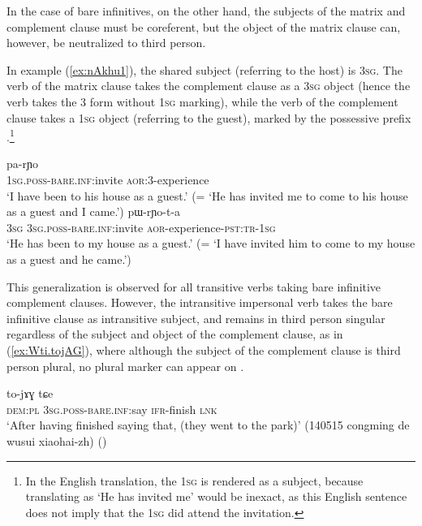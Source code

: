 In the case of bare infinitives, on the other hand, the subjects of the matrix and complement clause must be coreferent, but the object of the matrix clause can, however, be neutralized to third person.

In example (\ref{ex:nAkhu1}), the shared subject (referring to the host) is \textsc{3sg}. The verb of the matrix clause takes the complement clause as a \textsc{3sg} object (hence the verb takes the 3\flobv{} form without \textsc{1sg} marking), while the verb of the complement clause takes a \textsc{1sg} object (referring to the guest), marked by the possessive prefix .\footnote{In the English translation, the \textsc{1sg} is rendered as a subject, because translating   as `He has invited me' would be inexact, as this English sentence does not imply that the \textsc{1sg} did attend the invitation. }

\begin{exe}
\ex  \label{ex:nAkhu1}
\gll [a-nɤkʰu] pa-rɲo \\
\textsc{1sg}.\textsc{poss}-\textsc{bare}.\textsc{inf:}invite \textsc{aor}:3\flobv{}-experience \\
\glt `I have been to his house as a guest.' (= `He has invited me to come to his house as a guest and I came.')
\ex  \label{ex:nAkhu2}
 pɯ-rɲo-t-a  \\
\textsc{3sg}  \textsc{3sg}.\textsc{poss}-\textsc{bare}.\textsc{inf}:invite \textsc{aor}-experience-\textsc{pst}:\textsc{tr}-\textsc{1sg} \\
\glt `He has been to my house as a guest.' (= `I have invited him to come to my house as a guest and he came.')
\end{exe}

This generalization is observed for all transitive verbs taking bare infinitive complement clauses. However, the intransitive impersonal verb  takes the bare infinitive clause as intransitive subject, and remains in third person singular regardless of the subject and object of the complement clause, as in (\ref{ex:Wti.tojAG}), where although the subject of the complement clause is third person plural, no plural marker can appear on .

\begin{exe}
\ex \label{ex:Wti.tojAG}
\gll [nɯra ɯ-ti] to-jɤɣ tɕe \\
\textsc{dem}:\textsc{pl} \textsc{3sg}.\textsc{poss}-\textsc{bare}.\textsc{inf}:say \textsc{ifr}-finish \textsc{lnk}\\
\glt `After having finished saying that, (they went to the park)' (140515 congming de wusui xiaohai-zh)
()
\end{exe}

